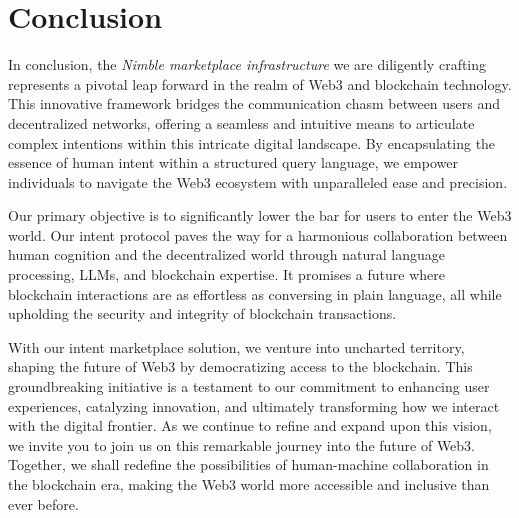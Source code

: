 \documentclass[11pt,letterpaper,twocolumn]{article}
\begin{document}
\section{Conclusion}
\label{sec:conclusion}
In conclusion, the \emph{Nimble marketplace infrastructure} we are diligently crafting represents a pivotal leap forward in the realm of Web3 and blockchain technology. This innovative framework bridges the communication chasm between users and decentralized networks, offering a seamless and intuitive means to articulate complex intentions within this intricate digital landscape. By encapsulating the essence of human intent within a structured query language, we empower individuals to navigate the Web3 ecosystem with unparalleled ease and precision.


Our primary objective is to significantly lower the bar for users to enter the Web3 world. Our intent protocol paves the way for a harmonious collaboration between human cognition and the decentralized world through natural language processing, LLMs, and blockchain expertise. It promises a future where blockchain interactions are as effortless as conversing in plain language, all while upholding the security and integrity of blockchain transactions.


With our intent marketplace solution, we venture into uncharted territory, shaping the future of Web3 by democratizing access to the blockchain. This groundbreaking initiative is a testament to our commitment to enhancing user experiences, catalyzing innovation, and ultimately transforming how we interact with the digital frontier. As we continue to refine and expand upon this vision, we invite you to join us on this remarkable journey into the future of Web3. Together, we shall redefine the possibilities of human-machine collaboration in the blockchain era, making the Web3 world more accessible and inclusive than ever before.



\end{document}
